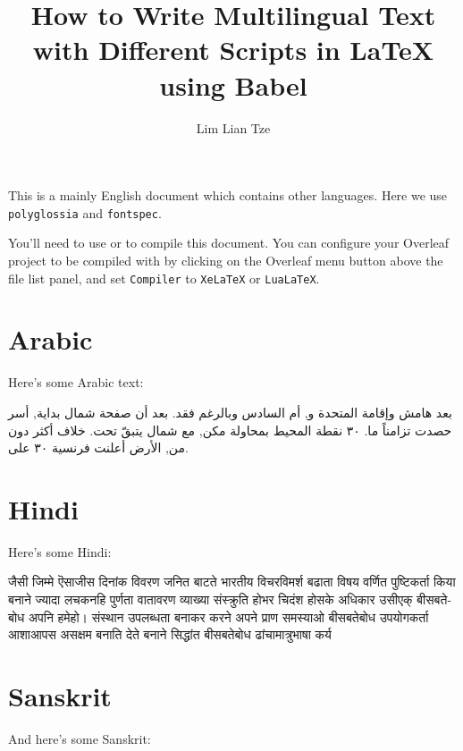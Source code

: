 \documentclass[12pt]{scrartcl}
\title{How to Write Multilingual Text with Different Scripts in \LaTeX{} using Babel}
\author{Lim Lian Tze}
\date{}
\begin{document}
\maketitle

This is a mainly English document which contains other languages. Here we use \texttt{polyglossia} and \texttt{fontspec}. 

You'll need to use  or  to compile this document. You can configure your Overleaf project to be compiled with  by clicking on the Overleaf menu button above the file list panel, and set \texttt{Compiler} to \texttt{XeLaTeX} or \texttt{LuaLaTeX}.



\section{Arabic}
Here's some Arabic text:

\begin{otherlanguage}{arabic}
بعد هامش وإقامة المتحدة و, أم السادس وبالرغم فقد. بعد أن صفحة شمال بداية, أسر حصدت تزامناً ما. ٣٠ نقطة المحيط بمحاولة مكن, مع شمال يتبقّ تحت. خلاف أكثر دون من, الأرض أعلنت فرنسية ٣٠ على.
\end{otherlanguage}



\section{Hindi}

Here's some Hindi:

\begin{otherlanguage}{hindi}
जैसी जिम्मे ऎसाजीस दिनांक विवरण जनित बाटते भारतीय विचरविमर्श बढाता विषय वर्णित पुष्टिकर्ता किया बनाने ज्यादा लचकनहि पुर्णता वातावरण व्याख्या संस्क्रुति होभर चिदंश होसके अधिकार उसीएक् बीसबतेबोध अपनि हमेहो। संस्थान उपलब्धता बनाकर करने अपने प्राण समस्याओ बीसबतेबोध उपयोगकर्ता आशाआपस असक्षम बनाति देते बनाने सिद्धांत बीसबतेबोध ढांचामात्रुभाषा कर्य
\end{otherlanguage}

\section{Sanskrit}
And here's some Sanskrit:
\end{document}
